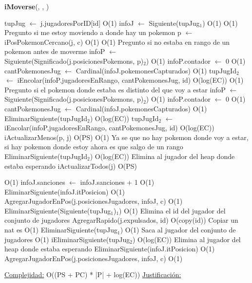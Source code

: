 \begin{algorithm}[H]{\textbf{iMoverse}(, , )}{}
	\begin{algorithmic}
	\State tupJug $\gets$ j.jugadoresPorID[id]	\Comment O(1)
	\State infoJ $\gets$ Siguiente(tupJug$_{1}$)	\Comment O(1)
		\Comment O(1) {Pregunto si me estoy moviendo a donde hay un pokemon}
		\State p $\gets$ iPosPokemonCercano(j, c)	\Comment O(1)
			\Comment O(1) {Pregunto si no estaba en rango de un pokemon antes de moverme}
			\State infoP $\gets$ Siguiente(Significado(j.posicionesPokemons, p)$_{2}$)	\Comment O(1)
			\State infoP.contador $\gets$ 0 \Comment O(1)
			\State cantPokemonesJug $\gets$ Cardinal(infoJ.pokemonesCapturados)	\Comment O(1)
			\State tupJugId$_{2}$ $\gets$ iEncolar(infoP.jugadoresEnRango, cantPokemonesJug, id)	\Comment O(log(EC))
		\Else
				\Comment O(1) {Pregunto si el pokemon donde estaba es distinto del que voy a estar}
				\State infoP $\gets$ Siguiente(Significado(j.posicionesPokemons, p)$_{2}$)	\Comment O(1)
			\State infoP.contador $\gets$ 0 \Comment O(1)
			\State cantPokemonesJug $\gets$ Cardinal(infoJ.pokemonesCapturados)	\Comment O(1)
			\State EliminarSiguiente(tupJugId$_{2}$)	\Comment O(log(EC))
			\State tupJugId$_{2}$ $\gets$ iEncolar(infoP.jugadoresEnRango, cantPokemonesJug, id)	\Comment O(log(EC))
			\EndIf
		\EndIf
		\State iActualizarMenos(p, j)	\Comment O(PS)
	\Else
			\Comment O(1) {Ya se que no hay pokemon donde voy a estar, si hay pokemon donde estoy ahora es que salgo de un rango}
			\State EliminarSiguiente(tupJugId$_{2}$)	\Comment O(log(EC)) {Elimina al jugador del heap donde estaba esperando}
		\EndIf
		\State iActualizarTodos(j)	\Comment O(PS)

	\EndIf
			\Comment O(1)
			\State infoJ.sanciones $\gets$ infoJ.sanciones + 1	\Comment O(1)
			\State EliminarSiguiente(infoJ.itPosicion) \Comment O(1)
			\State AgregarJugadorEnPos(j.posicionesJugadores, infoJ, c) \Comment O(1)
		\Else
			\State EliminarSiguiente(Siguiente(tupJug$_{1}$)$_{1}$)	\Comment O(1) {Elimina el id del jugador del conjunto de jugadores}
			\State AgregarRapido(j.expulsados, id)	\Comment O(copy(id)) {Copiar un nat es O(1)}
			\State EliminarSiguiente(tupJug$_{1}$)	\Comment O(1) {Saca al jugador del conjunto de jugadores}
      	\Comment O(1)
				\State iEliminarSiguiente(tupJug$_{2}$)	\Comment O(log(EC)) {Elimina al jugador del heap donde estaba esperando}
			\EndIf
		\EndIf
	\Else
		\State EliminarSiguiente(infoJ.itPosicion) \Comment O(1)
		\State AgregarJugadorEnPos(j.posicionesJugadores, infoJ, c) \Comment O(1)
	\EndIf

\medskip
\Statex \underline{Complejidad:} O((PS + PC) * |P| + log(EC))
\Statex \underline{Justificación:}
\end{algorithmic}
\end{algorithm}

